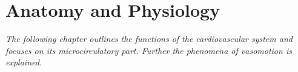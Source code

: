 \chapter{Anatomy and Physiology}
\textit{The following chapter outlines the functions of the cardiovascular system and focuses on its microcirculatory part. Further the phenomena of vasomotion is explained.}